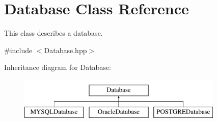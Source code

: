 \hypertarget{classDatabase}{
\section{Database Class Reference}
\label{classDatabase}
}


This class describes a database.  




{\ttfamily \#include $<$Database.hpp$>$}

Inheritance diagram for Database:\begin{figure}[H]
\begin{center}
\leavevmode
\includegraphics[height=2.000000cm]{classDatabase}
\end{center}
\end{figure}
